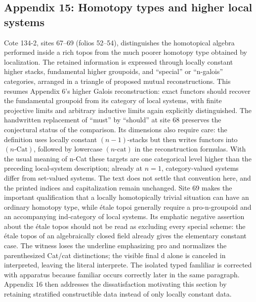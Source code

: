 \subsection*{Appendix 15: Homotopy types and higher local systems}
Cote 134-2, sites 67--69 (folios 52--54), distinguishes the homotopical algebra performed inside a rich topos from the much poorer homotopy type obtained by localization. The retained information is expressed through locally constant higher stacks, fundamental higher groupoids, and ``special'' or ``n-galois'' categories, arranged in a triangle of proposed mutual reconstructions. This resumes Appendix 6's higher Galois reconstruction: exact functors should recover the fundamental groupoid from its category of local systems, with finite projective limits and arbitrary inductive limits again explicitly distinguished. The handwritten replacement of ``must'' by ``should'' at site 68 preserves the conjectural status of the comparison. Its dimensions also require care: the definition uses locally constant $(n-1)$-stacks but then writes functors into $(n\text{-}\mathrm{Cat})$, followed by lowercase $(n\text{-}\mathrm{cat})$ in the reconstruction formulas. With the usual meaning of n-Cat these targets are one categorical level higher than the preceding local-system description; already at $n=1$, category-valued systems differ from set-valued systems. The text does not settle that convention here, and the printed indices and capitalization remain unchanged. Site 69 makes the important qualification that a locally homotopically trivial situation can have an ordinary homotopy type, while étale topoi generally require a pro-n-groupoid and an accompanying ind-category of local systems. Its emphatic negative assertion about the étale topos should not be read as excluding every special scheme: the étale topos of an algebraically closed field already gives the elementary constant case. The witness loses the underline emphasizing pro and normalizes the parenthesized Cat/cat distinctions; the visible final d alone is canceled in interpreted, leaving the literal interprete. The isolated typed famliliar is corrected with apparatus because familiar occurs correctly later in the same paragraph. Appendix 16 then addresses the dissatisfaction motivating this section by retaining stratified constructible data instead of only locally constant data.

